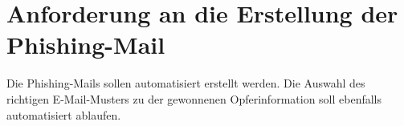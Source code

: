 \section{Anforderung an die Erstellung der Phishing-Mail}
Die Phishing-Mails sollen automatisiert erstellt werden. Die Auswahl des richtigen E-Mail-Musters zu der gewonnenen Opferinformation soll ebenfalls automatisiert ablaufen.
